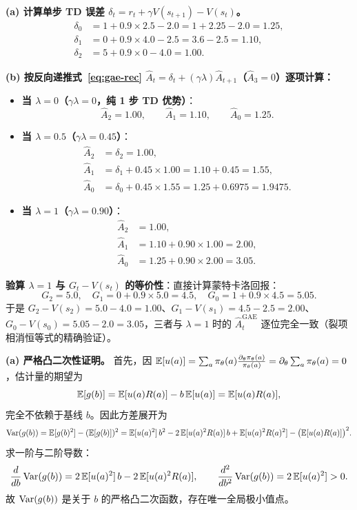 \textbf{(a) 计算单步 TD 误差 $\delta_t = r_t + \gamma V(s_{t+1}) - V(s_t)$。}
\begin{align*}
  \delta_0 &= 1 + 0.9 \times 2.5 - 2.0 = 1 + 2.25 - 2.0 = \mathbf{1.25}, \\
  \delta_1 &= 0 + 0.9 \times 4.0 - 2.5 = 3.6 - 2.5 = \mathbf{1.10}, \\
  \delta_2 &= 5 + 0.9 \times 0 - 4.0 = \mathbf{1.00}.
\end{align*}

\textbf{(b) 按反向递推式~\eqref{eq:gae-rec} $\hat{A}_t = \delta_t + (\gamma\lambda)\hat{A}_{t+1}$（$\hat{A}_3 = 0$）逐项计算：}
\begin{itemize}
  \item \textbf{当 $\lambda = 0$（$\gamma\lambda = 0$，纯 1 步 TD 优势）}：
  \[
    \hat{A}_2 = 1.00, \qquad \hat{A}_1 = 1.10, \qquad \hat{A}_0 = 1.25.
  \]
  \item \textbf{当 $\lambda = 0.5$（$\gamma\lambda = 0.45$）}：
  \begin{align*}
    \hat{A}_2 &= \delta_2 = \mathbf{1.00}, \\
    \hat{A}_1 &= \delta_1 + 0.45 \times 1.00 = 1.10 + 0.45 = \mathbf{1.55}, \\
    \hat{A}_0 &= \delta_0 + 0.45 \times 1.55 = 1.25 + 0.6975 = \mathbf{1.9475}.
  \end{align*}
  \item \textbf{当 $\lambda = 1$（$\gamma\lambda = 0.90$）}：
  \begin{align*}
    \hat{A}_2 &= 1.00, \\
    \hat{A}_1 &= 1.10 + 0.90 \times 1.00 = \mathbf{2.00}, \\
    \hat{A}_0 &= 1.25 + 0.90 \times 2.00 = \mathbf{3.05}.
  \end{align*}
\end{itemize}
\textbf{验算 $\lambda = 1$ 与 $G_t - V(s_t)$ 的等价性}：直接计算蒙特卡洛回报：
\[
  G_2 = 5.0, \quad G_1 = 0 + 0.9 \times 5.0 = 4.5, \quad G_0 = 1 + 0.9 \times 4.5 = 5.05.
\]
于是 $G_2 - V(s_2) = 5.0 - 4.0 = 1.00$、$G_1 - V(s_1) = 4.5 - 2.5 = 2.00$、$G_0 - V(s_0) = 5.05 - 2.0 = 3.05$，三者与 $\lambda = 1$ 时的 $\hat{A}_t^{\mathrm{GAE}}$ 逐位完全一致（裂项相消恒等式的精确验证）。


\textbf{(a) 严格凸二次性证明。} 首先，因 $\mathbb{E}[u(a)] = \sum_a \pi_\theta(a) \frac{\partial_\theta \pi_\theta(a)}{\pi_\theta(a)} = \partial_\theta \sum_a \pi_\theta(a) = 0$，估计量的期望为
\[
  \mathbb{E}[g(b)] = \mathbb{E}[u(a) R(a)] - b\,\mathbb{E}[u(a)] = \mathbb{E}[u(a) R(a)],
\]
完全不依赖于基线 $b$。因此方差展开为
\[
  \operatorname{Var}(g(b)) = \mathbb{E}[g(b)^2] - (\mathbb{E}[g(b)])^2 = \mathbb{E}[u(a)^2]\,b^2 - 2\,\mathbb{E}[u(a)^2 R(a)]\,b + \mathbb{E}[u(a)^2 R(a)^2] - \big(\mathbb{E}[u(a)R(a)]\big)^2.
\]
求一阶与二阶导数：
\[
  \frac{d}{db}\operatorname{Var}(g(b)) = 2\,\mathbb{E}[u(a)^2]\,b - 2\,\mathbb{E}[u(a)^2 R(a)], \qquad
  \frac{d^2}{db^2}\operatorname{Var}(g(b)) = 2\,\mathbb{E}[u(a)^2] > 0.
\]
故 $\operatorname{Var}(g(b))$ 是关于 $b$ 的严格凸二次函数，存在唯一全局极小值点。

